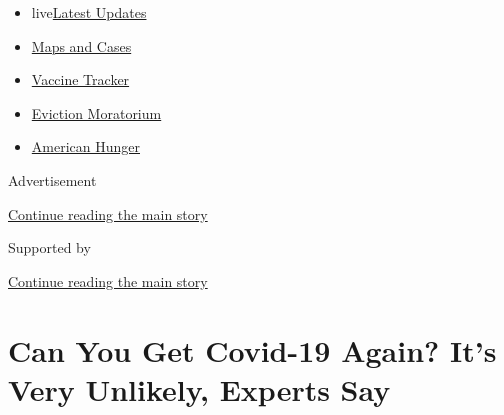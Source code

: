 \begin{itemize}
\tightlist
\item
  live\href{https://www.nytimes3xbfgragh.onion/2020/09/05/world/coronavirus-covid.html?name=styln-coronavirus-national\&region=TOP_BANNER\&block=storyline_menu_recirc\&action=click\&pgtype=Article\&impression_id=3dd1da20-efba-11ea-915b-f1361aecfd51\&variant=undefined}{Latest
  Updates}
\item
  \href{https://www.nytimes3xbfgragh.onion/interactive/2020/us/coronavirus-us-cases.html?name=styln-coronavirus-national\&region=TOP_BANNER\&block=storyline_menu_recirc\&action=click\&pgtype=Article\&impression_id=3dd1da21-efba-11ea-915b-f1361aecfd51\&variant=undefined}{Maps
  and Cases}
\item
  \href{https://www.nytimes3xbfgragh.onion/interactive/2020/science/coronavirus-vaccine-tracker.html?name=styln-coronavirus-national\&region=TOP_BANNER\&block=storyline_menu_recirc\&action=click\&pgtype=Article\&impression_id=3dd1da22-efba-11ea-915b-f1361aecfd51\&variant=undefined}{Vaccine
  Tracker}
\item
  \href{https://www.nytimes3xbfgragh.onion/2020/09/02/your-money/eviction-moratorium-covid.html?name=styln-coronavirus-national\&region=TOP_BANNER\&block=storyline_menu_recirc\&action=click\&pgtype=Article\&impression_id=3dd1da23-efba-11ea-915b-f1361aecfd51\&variant=undefined}{Eviction
  Moratorium}
\item
  \href{https://www.nytimes3xbfgragh.onion/interactive/2020/09/02/magazine/food-insecurity-hunger-us.html?name=styln-coronavirus-national\&region=TOP_BANNER\&block=storyline_menu_recirc\&action=click\&pgtype=Article\&impression_id=3dd1da24-efba-11ea-915b-f1361aecfd51\&variant=undefined}{American
  Hunger}
\end{itemize}

Advertisement

\protect\hyperlink{after-top}{Continue reading the main story}

Supported by

\protect\hyperlink{after-sponsor}{Continue reading the main story}

\hypertarget{can-you-get-covid-19-again-its-very-unlikely-experts-say}{%
\section{Can You Get Covid-19 Again? It's Very Unlikely, Experts
Say}\label{can-you-get-covid-19-again-its-very-unlikely-experts-say}}

